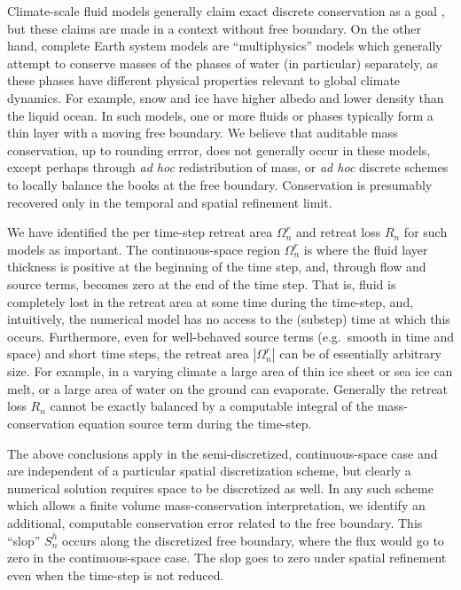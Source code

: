 \documentclass[final,onefignum]{siamart190516}
\begin{document}
Climate-scale fluid models generally claim exact discrete conservation as a goal \cite{Ringleretal2013,Thuburn2008}, but these claims are made in a context without free boundary.  On the other hand, complete Earth system models are ``multiphysics'' models which generally attempt to conserve masses of the phases of water (in particular) separately, as these phases have different physical properties relevant to global climate dynamics.  For example, snow and ice have higher albedo and lower density than the liquid ocean.  In such models, one or more fluids or phases typically form a thin layer with a moving free boundary.  We believe that auditable mass conservation, up to rounding errror, does not generally occur in these models, except perhaps through \emph{ad hoc} redistribution of mass, or \emph{ad hoc} discrete schemes to locally balance the books at the free boundary.  Conservation is presumably recovered only in the temporal and spatial refinement limit.

We have identified the per time-step retreat area $\Omega_n^r$ and retreat loss $R_n$ for such models as important.  The continuous-space region $\Omega_n^r$ is where the fluid layer thickness is positive at the beginning of the time step, and, through flow and source terms, becomes zero at the end of the time step.  That is, fluid is completely lost in the retreat area at some time during the time-step, and, intuitively, the numerical model has no access to the (substep) time at which this occurs.  Furthermore, even for well-behaved source terms (e.g.~smooth in time and space) and short time steps, the retreat area $|\Omega_n^r|$ can be of essentially arbitrary size.  For example, in a varying climate a large area of thin ice sheet or sea ice can melt, or a large area of water on the ground can evaporate.  Generally the retreat loss $R_n$ cannot be exactly balanced by a computable integral of the mass-conservation equation source term during the time-step.

The above conclusions apply in the semi-discretized, continuous-space case and are independent of a particular spatial discretization scheme, but clearly a numerical solution requires space to be discretized as well.  In any such scheme which allows a finite volume mass-conservation interpretation, we identify an additional, computable conservation error related to the free boundary.  This ``slop'' $S_n^h$ occurs along the discretized free boundary, where the flux would go to zero in the continuous-space case.  The slop goes to zero under spatial refinement even when the time-step is not reduced.
\end{document}
